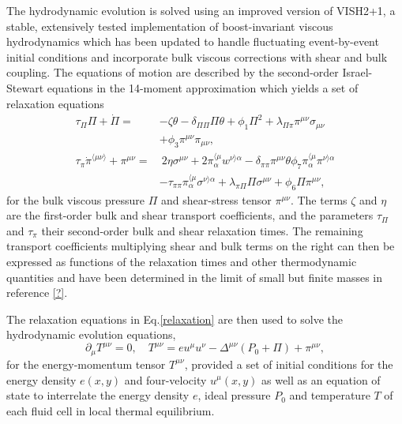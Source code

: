 \documentclass[aps,prc,reprint,amsmath,nofootinbib]{revtex4-1}
\begin{document}
The hydrodynamic evolution is solved using an improved version of VISH2+1, a stable, extensively tested implementation of boost-invariant viscous hydrodynamics which has been updated to handle fluctuating event-by-event initial conditions and incorporate bulk viscous corrections with shear and bulk coupling.
The equations of motion are described by the second-order Israel-Stewart equations in the 14-moment approximation which yields a set of relaxation equations
\begin{subequations}
    \label{relaxation}
    \begin{align}
        \tau_\Pi \Pi + \dot{\Pi} =& -\zeta \theta - \delta_{\Pi\Pi} \Pi\theta + \phi_1 \Pi^2 + \lambda_{\Pi\pi} \pi^{\mu\nu} \sigma_{\mu\nu} \nonumber \\ 
        &+\phi_3 \pi^{\mu\nu}\pi_{\mu\nu}, \\
        \tau_\pi \dot{\pi}^{\langle \mu\nu \rangle} + \pi^{\mu\nu} =& ~2\eta\sigma^{\mu\nu} + 2\pi_\alpha^{\langle \mu} w^{\nu \rangle \alpha} - \delta_{\pi\pi} \pi^{\mu\nu} \theta \phi_7    \pi_\alpha^{\langle \mu} \pi^{\nu \rangle \alpha} \nonumber \\
&-\tau_{\pi\pi} \pi_\alpha^{\langle \mu}\sigma^{\nu \rangle \alpha} + \lambda_{\pi\Pi} \Pi \sigma^{\mu\nu} + \phi_6 \Pi \pi^{\mu\nu},
    \end{align}
\end{subequations}
for the bulk viscous pressure $\Pi$ and shear-stress tensor $\pi^{\mu\nu}$.
The terms $\zeta$ and $\eta$ are the first-order bulk and shear transport coefficients, and the parameters $\tau_\Pi$ and $\tau_\pi$ their second-order bulk and shear relaxation times.
The remaining transport coefficients multiplying shear and bulk terms on the right can then be expressed as functions of the relaxation times and other thermodynamic quantities and have been determined in the limit of small but finite masses in reference \ref{?}.

The relaxation equations in Eq.\eqref{relaxation} are then used to solve the hydrodynamic evolution equations,
\begin{equation}
    \label{conservation}
    \partial_\mu T^{\mu\nu} = 0, \quad T^{\mu\nu} = e u^\mu u^\nu  - \Delta^{\mu\nu} (P_0 + \Pi) + \pi^{\mu\nu},
\end{equation}
for the energy-momentum tensor $T^{\mu\nu}$, provided a set of initial conditions for the energy density $e(x,y)$ and four-velocity $u^\mu(x,y)$ as well as an equation of state to interrelate the energy density $e$, ideal pressure $P_0$ and temperature $T$ of each fluid cell in local thermal equilibrium.
\end{document}
